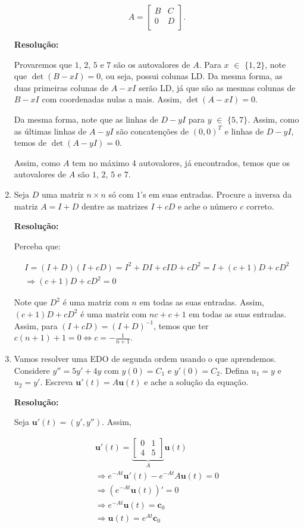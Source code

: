 \documentclass[leqno]{article}
\begin{document}
\begin{enumerate}
    $$A=\begin{bmatrix}
    B & C\\
    0 & D\\
    \end{bmatrix}\text{.}$$
    
    \textbf{Resolução:}
    
    Provaremos que $1$, $2$, $5$ e $7$ são os autovalores de $A$. Para $x$ $\in$ $\{1,2\}$, note que $\det(B-xI)=0$, ou seja, possui colunas LD. Da mesma forma, as duas primeiras colunas de $A-xI$ serão LD, já que são as mesmas colunas de $B-xI$ com coordenadas nulas a mais. Assim, $\det(A-xI)=0$.
    
    Da mesma forma, note que as linhas de $D-yI$ para $y$ $\in$ $\{5,7\}$. Assim, como as últimas linhas de $A-yI$ são concatenções de $(0,0)^T$ e linhas de $D-yI$, temos de $\det(A-yI)=0$.
    
    Assim, como $A$ tem no máximo 4 autovalores, já encontrados, temos que os autovalores de $A$ são $1$, $2$, $5$ e $7$.
    
    \item Seja $D$ uma matriz $n\times n$ só com $1$'s em suas entradas. Procure a inversa da matriz $A=I+D$ dentre as matrizes $I+cD$ e ache o número $c$ correto.
    
    \textbf{Resolução:}
    
    Perceba que:
    
    \begin{align*}
    I=(I+D)(I+cD)=I^2+DI+cID+cD^2=I+(c+1)D+cD^2\\
    \Rightarrow (c+1)D+cD^2=0
    \end{align*}
    
    Note que $D^2$ é uma matriz com $n$ em todas as suas entradas. Assim, $(c+1)D+cD^2$ é uma matriz com $nc+c+1$ em todas as suas entradas. Assim, para $(I+cD)=(I+D)^{-1}$, temos que ter $c(n+1)+1=0\iff c=-\frac{1}{n+1}$.
    
    
    \item Vamos resolver uma EDO de segunda ordem usando o que aprendemos. Considere $y''=5y'+4y$ com $y(0)=C_1$ e $y'(0)=C_2$. Defina $u_1=y$ e $u_2=y'$. Escreva $\textbf{u}'(t)=A\textbf{u}(t)$ e ache a solução da equação.
    
    \textbf{Resolução:}
    
    Seja $\textbf{u}'(t)=(y',y'')$. Assim,
    
    \begin{align*}
        \textbf{u}'(t)=\underbrace{\begin{bmatrix}0 & 1\\
        4 & 5\end{bmatrix}}_A\textbf{u}(t)\\
        \Rightarrow e^{-At}\textbf{u}'(t)-e^{-At}A\textbf{u}(t)=0\\
        \Rightarrow (e^{-At}\textbf{u}(t))'=0\\
        \Rightarrow e^{-At}\textbf{u}(t)=\textbf{c}_0\\
        \Rightarrow \textbf{u}(t)=e^{At}\textbf{c}_0
    \end{align*}
    

\end{enumerate}
\end{document}
